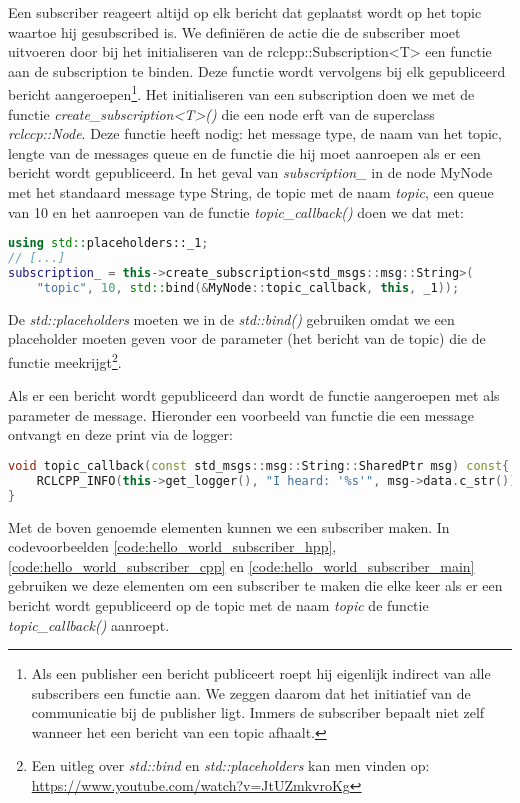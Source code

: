 \noindent Een subscriber reageert altijd op elk bericht dat geplaatst wordt op het topic waartoe hij gesubscribed is. We definiëren de actie die de subscriber moet uitvoeren door bij het initialiseren van de rclcpp::Subscription<T> een functie aan de subscription te binden. Deze functie wordt vervolgens bij elk gepubliceerd bericht aangeroepen\footnote{Als een publisher een bericht publiceert roept hij eigenlijk indirect van alle subscribers een functie aan. We zeggen daarom dat het initiatief van de communicatie bij de publisher ligt. Immers de subscriber bepaalt niet zelf wanneer het een bericht van een topic afhaalt.}. Het initialiseren van een subscription doen we met de functie \textit{create\_subscription<T>()} die een node erft van de superclass \textit{rclccp::Node}. Deze functie heeft nodig: het message type, de naam van het topic, lengte van de messages queue en de functie die hij moet aanroepen als er een bericht wordt gepubliceerd. In het geval van \textit{subscription\_} in de node MyNode met het standaard message type String, de topic met de naam \textit{topic}, een queue van 10 en het aanroepen van de functie \textit{topic\_callback()} doen we dat met:
\begin{lstlisting}[language=C++, firstnumber=0, label={}]
using std::placeholders::_1;
// [...]
subscription_ = this->create_subscription<std_msgs::msg::String>(
    "topic", 10, std::bind(&MyNode::topic_callback, this, _1));
\end{lstlisting}
\noindent De \textit{std::placeholders} moeten we in de \textit{std::bind()} gebruiken omdat we een placeholder moeten geven voor de parameter (het bericht van de topic) die de functie meekrijgt\footnote{Een uitleg over \textit{std::bind} en \textit{std::placeholders} kan men vinden op: \url{https://www.youtube.com/watch?v=JtUZmkvroKg}}.

Als er een bericht wordt gepubliceerd dan wordt de functie aangeroepen met als parameter de message. Hieronder een voorbeeld van functie die een message ontvangt en deze print via de logger:

\begin{lstlisting}[language=C++, firstnumber=0, label={}]
void topic_callback(const std_msgs::msg::String::SharedPtr msg) const{
    RCLCPP_INFO(this->get_logger(), "I heard: '%s'", msg->data.c_str());
}
\end{lstlisting}

\noindent Met de boven genoemde elementen kunnen we een subscriber maken. In codevoorbeelden \ref{code:hello_world_subscriber_hpp}, \ref{code:hello_world_subscriber_cpp} en \ref{code:hello_world_subscriber_main} gebruiken we deze elementen om een subscriber te maken die elke keer als er een bericht wordt gepubliceerd op de topic met de naam \textit{topic} de functie \textit{topic\_callback()} aanroept.


